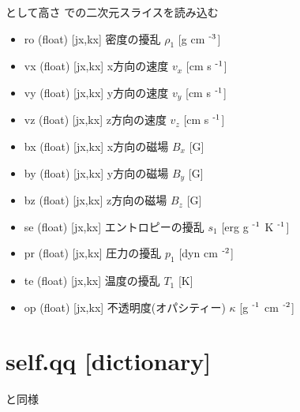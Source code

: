 \documentclass[letterpaper,10pt,dvipdfmx,report]{sphinxmanual}
\begin{document}
として高さ  での二次元スライスを読み込む
\begin{itemize}
\item {} 
ro (float) {[}jx,kx{]} \sphinxhyphen{}\sphinxhyphen{} 密度の擾乱 \(\rho_1\) {[}g cm $^{\text{\sphinxhyphen{}3}}${]}

\item {} 
vx (float) {[}jx,kx{]} \sphinxhyphen{}\sphinxhyphen{} x方向の速度 \(v_x\) {[}cm s $^{\text{\sphinxhyphen{}1}}${]}

\item {} 
vy (float) {[}jx,kx{]} \sphinxhyphen{}\sphinxhyphen{} y方向の速度 \(v_y\) {[}cm s $^{\text{\sphinxhyphen{}1}}${]}

\item {} 
vz (float) {[}jx,kx{]} \sphinxhyphen{}\sphinxhyphen{} z方向の速度 \(v_z\) {[}cm s $^{\text{\sphinxhyphen{}1}}${]}

\item {} 
bx (float) {[}jx,kx{]} \sphinxhyphen{}\sphinxhyphen{} x方向の磁場 \(B_x\) {[}G{]}

\item {} 
by (float) {[}jx,kx{]} \sphinxhyphen{}\sphinxhyphen{} y方向の磁場 \(B_y\) {[}G{]}

\item {} 
bz (float) {[}jx,kx{]} \sphinxhyphen{}\sphinxhyphen{} z方向の磁場 \(B_z\) {[}G{]}

\item {} 
se (float) {[}jx,kx{]} \sphinxhyphen{}\sphinxhyphen{} エントロピーの擾乱 \(s_1\) {[}erg g $^{\text{\sphinxhyphen{}1}}$ K $^{\text{\sphinxhyphen{}1}}${]}

\item {} 
pr (float) {[}jx,kx{]} \sphinxhyphen{}\sphinxhyphen{} 圧力の擾乱 \(p_1\) {[}dyn cm $^{\text{\sphinxhyphen{}2}}${]}

\item {} 
te (float) {[}jx,kx{]} \sphinxhyphen{}\sphinxhyphen{} 温度の擾乱 \(T_1\) {[}K{]}

\item {} 
op (float) {[}jx,kx{]} \sphinxhyphen{}\sphinxhyphen{} 不透明度(オパシティー) \(\kappa\) {[}g $^{\text{\sphinxhyphen{}1}}$ cm $^{\text{\sphinxhyphen{}2}}${]}

\end{itemize}


\section{self.qq {[}dictionary{]}}
\label{\detokenize{notation:self-qq-dictionary}}
 と同様
\end{document}
